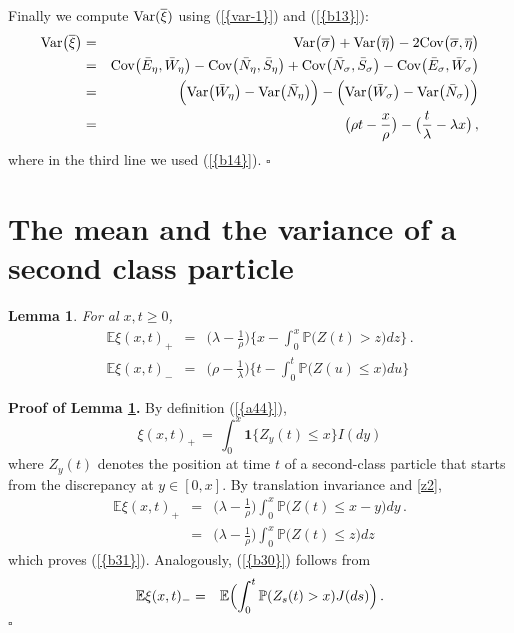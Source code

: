 \documentclass[reqno, 12pt]{amsart}
\newtheorem{lemma}{Lemma}
\begin{document}
Finally we compute ${{\rm Var}}({{\overline \xi}})$ using {(\ref{{var-1}})} and {(\ref{{b13}})}:
\begin{eqnarray}
  \label{b15}
  {{\rm Var}} \big({{\overline \xi}}\big)&=&{{\rm Var}} \big({{\overline \sigma}}\big)+{{\rm Var}} \big({{\overline \eta}}\big)-2
  {{\rm Cov}} \big({{\overline \sigma}},{{\overline \eta}}\big)\nonumber\\
  &=& {{\rm Cov}} \big({{\bar E}}_\eta,{{\bar W}}_\eta\big)-{{\rm Cov}}
  \big({{\bar N}}_\eta,{{\bar S}}_\eta\big) + {{\rm Cov}}
  \big({{\bar N}}_\sigma,{{\bar S}}_\sigma\big) - {{\rm Cov}} \big({{\bar E}}_\sigma,{{\bar W}}_\sigma\big)\nonumber\\
  &=& \Big({{\rm Var}} \big({{\bar W}}_\eta\big)-{{\rm Var}} \big({{\bar N}}_\eta
  \big)\Big)-\Big({{\rm Var}} \big({{\bar W}}_\sigma\big)-{{\rm Var}} \big({{\bar N}}_\sigma\big)\Big)\nonumber\\
  &=&
  \big(\rho t-\frac{x}{\rho}\big)-\big(\frac{t}{\lambda}-\lambda
  x\big)\,,
\end{eqnarray}
where in the third line we used {(\ref{{b14}})}. {$\square$ \vskip 2mm}

\section{The mean and the variance of a second class particle}
\begin{lemma}
  \label{xt+}
For al $x,t\ge 0$,
\begin{eqnarray}
  \label{b1}
  {{\mathbb E}}\xi(x,t)_+
  &=&\big(\lambda-\frac{1}{\rho}\big) \Big\{x-\int_0^x{{\mathbb P}}\big(Z(t)>z\big)dz\Big\}\,.\label{b31} \\
  {{\mathbb E}}\xi(x,t)_-
  &=&  \big(\rho-\frac{1}{\lambda}\big) \Big\{t-\int_0^t{{\mathbb P}}\big(Z(u)\leq x\big)du\Big\} \label{b30}
\end{eqnarray}
\end{lemma}
{{\noindent \bf Proof of {Lemma \ref{xt+}}.}} By definition {(\ref{{a44}})},
\[
\xi(x,t)_+
\,=\,\int_0^x{{\mathbf 1}}\{Z_y(t)\leq x\}{I}(dy)
\]
where $Z_y(t)$ denotes the position at time $t$ of a second-class particle that
starts from the discrepancy at $y\in[0,x]$. By translation invariance and
\eqref{z2},
\begin{eqnarray}
  \label{b1}
  {{\mathbb E}}\xi(x,t)_+
  &=&\big(\lambda-\frac{1}{\rho}\big)\int_0^x{{\mathbb P}}\big(Z(t)\leq x-y\big)dy\,.\label{den-1}\\
  &=&\big(\lambda-\frac{1}{\rho}\big)\int_0^x{{\mathbb P}}\big(Z(t)\leq
  z\big)dz
  \nonumber
\end{eqnarray}
which proves {(\ref{{b31}})}. Analogously, {(\ref{{b30}})} follows from
\begin{eqnarray}
  \label{a45}
  {{\mathbb E}}\xi(x,t)_- &=& {{\mathbb E}}\Bigl(\int_0^t {{\mathbb P}}(Z_s(t)>x) J(ds)\Bigr)\,.
\end{eqnarray}
{$\square$ \vskip 2mm}
\end{document}
